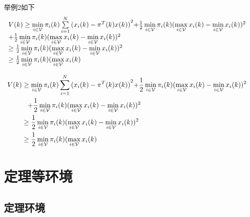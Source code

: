 \documentclass[master]{styles/hdu-thesis}
\begin{document}
举例2如下
\[\begin{array}{l}
V(k) \ge \mathop {\min }\limits_{i \in {\cal V}} {\pi _i}(k)\sum\limits_{i = 1}^N {{{({x_i}(k) - {\pi ^T}(k)x(k))}^2}} {\rm{ + }}\frac{1}{2}\mathop {\min }\limits_{i \in {\cal V}} {\pi _i}(k){(\mathop {\max }\limits_{i \in {\cal V}} {x_i}(k) - \mathop {\min }\limits_{i \in {\cal V}} {x_i}(k))^2}\\
{\rm{ + }}\frac{1}{2}\mathop {\min }\limits_{i \in {\cal V}} {\pi _i}(k){(\mathop {\max }\limits_{i \in {\cal V}} {x_i}(k) - \mathop {\min }\limits_{i \in {\cal V}} {x_i}(k))^2}\\
 \ge \frac{1}{2}\mathop {\min }\limits_{i \in {\cal V}} {\pi _i}(k){(\mathop {\max }\limits_{i \in {\cal V}} {x_i}(k) - \mathop {\min }\limits_{i \in {\cal V}} {x_i}(k))^2}\\
 \ge \frac{1}{2}\mathop {\min }\limits_{i \in {\cal V}} {\pi _i}(k)(\mathop {\max }\limits_{i \in {\cal V}} {x_i}(k)
\end{array}\]




\begin{equation}\label{system4}
  \begin{split}
V(k) &\ge \mathop {\min }\limits_{i \in {\cal V}} {\pi _i}(k)\sum\limits_{i = 1}^N {{{({x_i}(k) - {\pi ^T}(k)x(k))}^2}} {\rm{ + }}\frac{1}{2}\mathop {\min }\limits_{i \in {\cal V}} {\pi _i}(k){(\mathop {\max }\limits_{i \in {\cal V}} {x_i}(k) - \mathop {\min }\limits_{i \in {\cal V}} {x_i}(k))^2}\\
&\hspace{0.3cm}{\rm{ + }}\frac{1}{2}\mathop {\min }\limits_{i \in {\cal V}} {\pi _i}(k){(\mathop {\max }\limits_{i \in {\cal V}} {x_i}(k) - \mathop {\min }\limits_{i \in {\cal V}} {x_i}(k))^2}\\
& \ge \frac{1}{2}\mathop {\min }\limits_{i \in {\cal V}} {\pi _i}(k){(\mathop {\max }\limits_{i \in {\cal V}} {x_i}(k) - \mathop {\min }\limits_{i \in {\cal V}} {x_i}(k))^2}\\
 &\ge \frac{1}{2}\mathop {\min }\limits_{i \in {\cal V}} {\pi _i}(k)(\mathop {\max }\limits_{i \in {\cal V}} {x_i}(k)
  \end{split}
\end{equation}


\section{定理等环境}
\subsection{定理环境}
\end{document}
